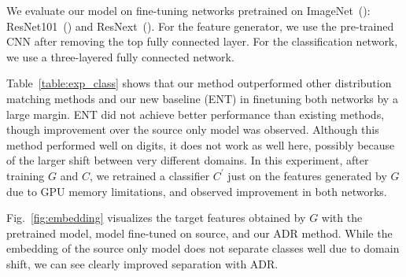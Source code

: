 \documentclass{article} \usepackage{iclr2018_conference,times}
\begin{document}
We evaluate our model on fine-tuning networks pretrained on ImageNet~(\cite{deng2009imagenet}):
 ResNet101~(\cite{he2016deep}) and ResNext~(\cite{xie2016aggregated}). For the feature generator, we use the pre-trained CNN after removing the top fully connected layer. For the classification network, we use a three-layered fully connected network.

Table~\ref{table:exp_class} shows that our method outperformed other distribution matching methods and our new baseline (ENT) in finetuning both networks by a large margin. ENT did not achieve better performance than existing methods, though improvement over the source only model was observed. Although this method performed well on digits, it does not work as well here, possibly because of the larger shift between very different domains. 
In this experiment, after training $G$ and $C$, we retrained a classifier $C^{'}$ just on the features generated by $G$ due to GPU memory limitations, and observed improvement in both networks. 

Fig.~\ref{fig:embedding} visualizes the target features obtained by $G$ with the pretrained model, model fine-tuned on source, and our ADR method. While the embedding of the source only model does not separate classes well due to domain shift, we can see clearly improved separation with ADR. 
\end{document}
